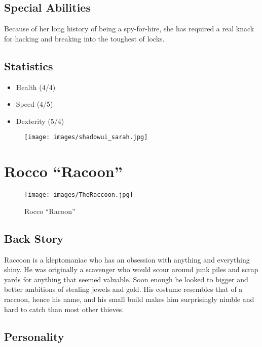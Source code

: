 \documentclass[11pt]{report}
\begin{document}
\subsection{Special Abilities}

Because of her long history of being a spy-for-hire, she has required a real knack for hacking and breaking into the toughest of locks.

\subsection{Statistics}

\begin{itemize}
    \item Health (4/4)
    \item Speed (4/5)
    \item Dexterity (5/4)
\end{itemize}

\begin{figure}[H]
    \centering
    \texttt{[image: images/shadowui\_sarah.jpg]}
    \caption{}
\end{figure}

\section{Rocco ``Racoon''}

\begin{figure}[H]
    \centering
    \texttt{[image: images/TheRaccoon.jpg]}
    \caption{Rocco ``Racoon''}
\end{figure}

\subsection{Back Story}

Raccoon is a kleptomaniac who has an obsession with anything and everything shiny. He was originally a scavenger who would scour around junk piles and scrap yards for anything that seemed valuable. Soon enough he looked to bigger and better ambitions of stealing jewels and gold. His costume resembles that of a raccoon, hence his name, and his small build makes him surprisingly nimble and hard to catch than most other thieves.

\subsection{Personality}
\end{document}
